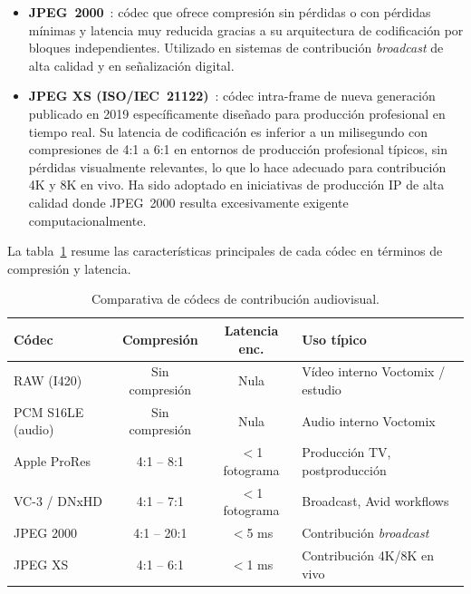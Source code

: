 \begin{itemize}
  \item \textbf{\ac{JPEG}~2000}~\cite{jpeg2000_iso}: códec que ofrece compresión sin
  pérdidas o con pérdidas mínimas y latencia muy reducida gracias a su arquitectura de
  codificación por bloques independientes. Utilizado en sistemas de contribución
  \textit{broadcast} de alta calidad y en señalización digital.

  \item \textbf{JPEG XS (ISO/IEC~21122)}~\cite{jpeg_xs_iso}: códec intra-frame de
  nueva generación publicado en 2019 específicamente diseñado para producción
  profesional en tiempo real. Su latencia de codificación es inferior a un milisegundo
  con compresiones de 4:1 a 6:1 en entornos de producción profesional típicos, sin
  pérdidas visualmente relevantes, lo que lo hace adecuado para contribución 4K y 8K
  en vivo. Ha sido adoptado en iniciativas de producción IP de alta calidad donde
  JPEG~2000 resulta excesivamente exigente computacionalmente.
\end{itemize}

La tabla~\ref{tab:codecs_contribucion} resume las características principales de cada
códec en términos de compresión y latencia.

\begin{table}[H]
  \centering
  \caption{Comparativa de códecs de contribución audiovisual.}
  \label{tab:codecs_contribucion}
  \small
  \begin{tabularx}{\textwidth}{|l|c|c|X|}
    \hline
    \textbf{Códec} & \textbf{Compresión} & \textbf{Latencia enc.} & \textbf{Uso típico} \\
    \hline
    RAW (I420)          & Sin compresión & Nula           & Vídeo interno Voctomix / estudio \\
    PCM S16LE (audio)   & Sin compresión & Nula           & Audio interno Voctomix \\
    Apple ProRes        & 4:1 -- 8:1     & $<$1 fotograma & Producción TV, postproducción \\
    VC-3 / DNxHD        & 4:1 -- 7:1     & $<$1 fotograma & Broadcast, Avid workflows \\
    JPEG 2000           & 4:1 -- 20:1    & $<$5 ms        & Contribución \textit{broadcast} \\
    JPEG XS             & 4:1 -- 6:1     & $<$1 ms        & Contribución 4K/8K en vivo \\
    \hline
  \end{tabularx}
\end{table}
